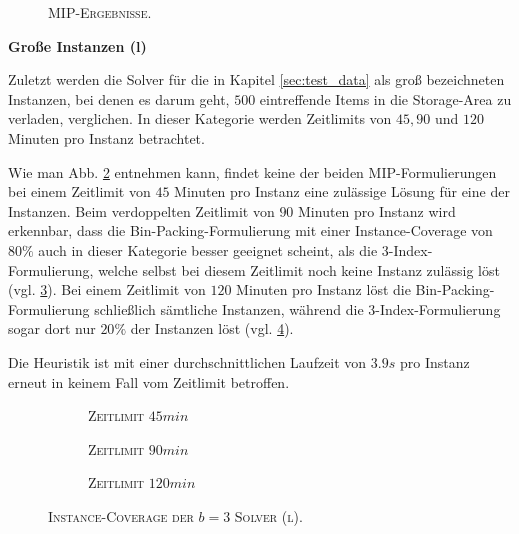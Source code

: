 \begin{figure}[H]
\caption{\textsc{MIP-Ergebnisse.}}
\label{fig:mip_results_b=3_m}
\end{figure}

\pagebreak

\textbf{Große Instanzen (l)}

Zuletzt werden die Solver für die in Kapitel \ref{sec:test_data} als groß bezeichneten Instanzen,
bei denen es darum geht, $500$ eintreffende Items in die Storage-Area zu verladen, verglichen.
In dieser Kategorie werden Zeitlimits von $45, 90$ und $120$ Minuten pro Instanz betrachtet.

Wie man Abb. \ref{fig:instance_coverage_b=3_l_a} entnehmen kann, findet keine der beiden MIP-Formulierungen
bei einem Zeitlimit von $45$ Minuten pro Instanz eine zulässige Lösung für eine der Instanzen.
Beim verdoppelten Zeitlimit von $90$ Minuten pro Instanz wird erkennbar, dass die Bin-Packing-Formulierung
mit einer Instance-Coverage von $80 \%$ auch in dieser Kategorie besser geeignet scheint, als die 3-Index-Formulierung,
welche selbst bei diesem Zeitlimit noch keine Instanz zulässig löst (vgl. \ref{fig:instance_coverage_b=3_l_b}).
Bei einem Zeitlimit von $120$ Minuten pro Instanz löst die Bin-Packing-Formulierung schließlich sämtliche Instanzen,
während die 3-Index-Formulierung sogar dort nur $20 \%$ der Instanzen löst (vgl. \ref{fig:instance_coverage_b=3_l_c}).

Die Heuristik ist mit einer durchschnittlichen Laufzeit von $3.9s$ pro Instanz erneut in keinem Fall
vom Zeitlimit betroffen.

\begin{figure}[H]
\centering

\begin{subfigure}[b]{0.3\textwidth}
\centering
\caption{\textsc{Zeitlimit} $45min$}
\label{fig:instance_coverage_b=3_l_a}
\end{subfigure}
\hfill
\begin{subfigure}[b]{0.3\textwidth}
\centering
\caption{\textsc{Zeitlimit} $90min$}
\label{fig:instance_coverage_b=3_l_b}
\end{subfigure}
\hfill
\begin{subfigure}[b]{0.3\textwidth}
\centering
\caption{\textsc{Zeitlimit} $120min$}
\label{fig:instance_coverage_b=3_l_c}
\end{subfigure}
\caption{\textsc{Instance-Coverage der $b = 3$ Solver (l)}.}
\label{}
\end{figure}

